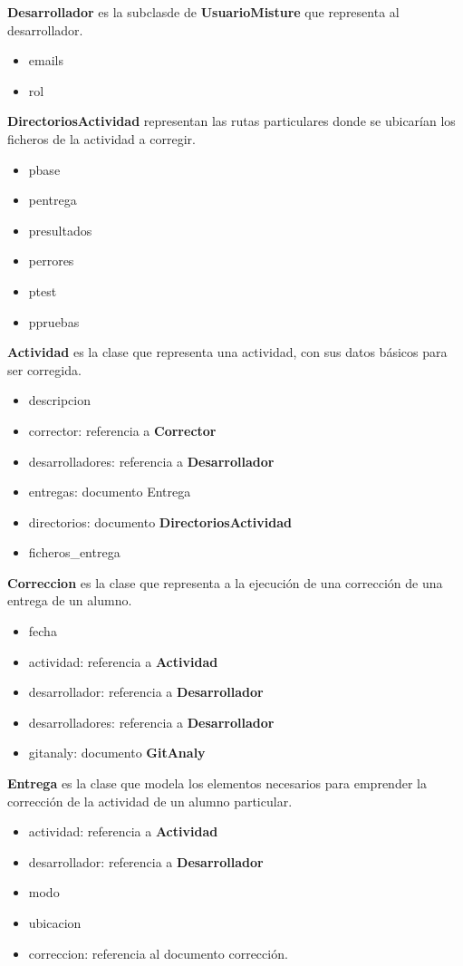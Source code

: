 \textbf{Desarrollador} es la subclasde de \textbf{UsuarioMisture} que representa al desarrollador.
\begin{itemize}
\item emails
\item rol
\end{itemize}


\textbf{DirectoriosActividad} representan las rutas particulares donde se ubicarían los ficheros de la actividad a corregir.
\begin{itemize}
\item pbase
\item pentrega
\item presultados
\item perrores
\item ptest
\item ppruebas
\end{itemize}


\textbf{Actividad} es la clase que representa una actividad, con sus datos básicos para ser corregida.
\begin{itemize}
\item descripcion
\item corrector: referencia a \textbf{Corrector}
\item desarrolladores: referencia a \textbf{Desarrollador}
\item entregas: documento Entrega
\item directorios: documento \textbf{DirectoriosActividad}
\item ficheros\_entrega
\end{itemize}


\textbf{Correccion} es la clase que representa a la ejecución de una corrección de una entrega de un alumno.
\begin{itemize}
\item fecha
\item actividad: referencia a \textbf{Actividad}
\item desarrollador: referencia a \textbf{Desarrollador}
\item desarrolladores: referencia a \textbf{Desarrollador}
\item gitanaly: documento \textbf{GitAnaly}
\end{itemize}


\textbf{Entrega} es la clase que modela los elementos necesarios para emprender la corrección de la actividad de un alumno particular.
\begin{itemize}
\item actividad: referencia a \textbf{Actividad}
\item desarrollador: referencia a \textbf{Desarrollador}
\item modo
\item ubicacion
\item correccion: referencia al documento corrección.
\end{itemize}


